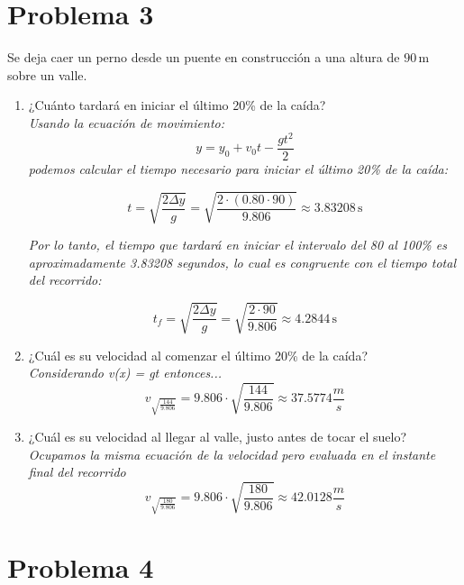 \documentclass{article}
\begin{document}
\section*{Problema 3}

Se deja caer un perno desde un puente en construcción a una altura de $90 \, \text{m}$ sobre un valle.

\begin{enumerate}
    \item ¿Cuánto tardará en iniciar el último 20\% de la caída? \\
  \textit{Usando la ecuación de movimiento:}
  \[
  y = y_0 + v_0t - \frac{gt^2}{2}
  \]
  \textit{podemos calcular el tiempo necesario para iniciar el último 20\% de la caída:}
  
  \[
  t = \sqrt{\frac{2\Delta y}{g}} = \sqrt{\frac{2 \cdot (0.80 \cdot 90)}{9.806}} \approx 3.83208 \, \text{s}
  \]
  
  \textit{Por lo tanto, el tiempo que tardará en iniciar el intervalo del 80 al 100\% es aproximadamente 3.83208 segundos, lo cual es congruente con el tiempo total del recorrido:}
  
  \[
  t_f = \sqrt{\frac{2\Delta y}{g}} = \sqrt{\frac{2 \cdot 90}{9.806}} \approx 4.2844 \, \text{s}
  \]
  
  \item ¿Cuál es su velocidad al comenzar el último 20\% de la caída? \\
  \textit{Considerando v(x) = gt entonces...}
  \[
  v_{\sqrt{\frac{144}{9.806}}} = 9.806 \cdot \sqrt{\frac{144}{9.806}} \approx 37.5774 \frac{m}{s}
  \]
  
  \item ¿Cuál es su velocidad al llegar al valle, justo antes de tocar el suelo? \\
  \textit{Ocupamos la misma ecuación de la velocidad pero evaluada en el instante final del recorrido}
  \[
  v_{\sqrt{\frac{180}{9.806}}} = 9.806 \cdot \sqrt{\frac{180}{9.806}} \approx 42.0128 \frac{m}{s}
  \]
\end{enumerate}

\section*{Problema 4}
\end{document}
